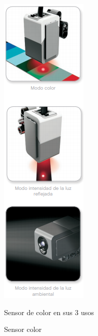 \begin{figure}
    \centering
    \includegraphics[width=0.6\linewidth]{img/color.png}
    \caption{Sensor color}{{\footnotesize Sensor de color en sus 3 usos}}
    \label{fig:color}
\end{figure}

